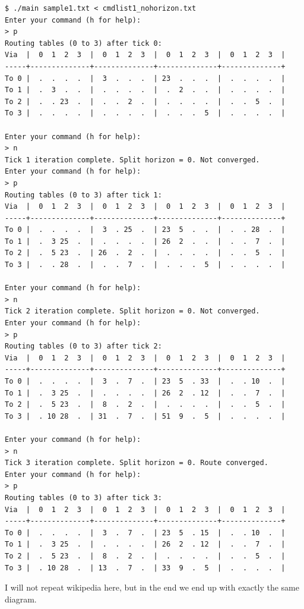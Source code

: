 \documentclass[english,11pt]{article}
\newcommand{\ok}{\fontsize{9}{11}\selectfont}
\begin{document}
\clearpage
{\ok
\begin{verbatim}
$ ./main sample1.txt < cmdlist1_nohorizon.txt
Enter your command (h for help):
> p
Routing tables (0 to 3) after tick 0:
Via  |  0  1  2  3  |  0  1  2  3  |  0  1  2  3  |  0  1  2  3  |
-----+--------------+--------------+--------------+--------------+
To 0 |  .  .  .  .  |  3  .  .  .  | 23  .  .  .  |  .  .  .  .  |
To 1 |  .  3  .  .  |  .  .  .  .  |  .  2  .  .  |  .  .  .  .  |
To 2 |  .  . 23  .  |  .  .  2  .  |  .  .  .  .  |  .  .  5  .  |
To 3 |  .  .  .  .  |  .  .  .  .  |  .  .  .  5  |  .  .  .  .  |

Enter your command (h for help):
> n
Tick 1 iteration complete. Split horizon = 0. Not converged.
Enter your command (h for help):
> p
Routing tables (0 to 3) after tick 1:
Via  |  0  1  2  3  |  0  1  2  3  |  0  1  2  3  |  0  1  2  3  |
-----+--------------+--------------+--------------+--------------+
To 0 |  .  .  .  .  |  3  . 25  .  | 23  5  .  .  |  .  . 28  .  |
To 1 |  .  3 25  .  |  .  .  .  .  | 26  2  .  .  |  .  .  7  .  |
To 2 |  .  5 23  .  | 26  .  2  .  |  .  .  .  .  |  .  .  5  .  |
To 3 |  .  . 28  .  |  .  .  7  .  |  .  .  .  5  |  .  .  .  .  |

Enter your command (h for help):
> n
Tick 2 iteration complete. Split horizon = 0. Not converged.
Enter your command (h for help):
> p
Routing tables (0 to 3) after tick 2:
Via  |  0  1  2  3  |  0  1  2  3  |  0  1  2  3  |  0  1  2  3  |
-----+--------------+--------------+--------------+--------------+
To 0 |  .  .  .  .  |  3  .  7  .  | 23  5  . 33  |  .  . 10  .  |
To 1 |  .  3 25  .  |  .  .  .  .  | 26  2  . 12  |  .  .  7  .  |
To 2 |  .  5 23  .  |  8  .  2  .  |  .  .  .  .  |  .  .  5  .  |
To 3 |  . 10 28  .  | 31  .  7  .  | 51  9  .  5  |  .  .  .  .  |

Enter your command (h for help):
> n
Tick 3 iteration complete. Split horizon = 0. Route converged.
Enter your command (h for help):
> p
Routing tables (0 to 3) after tick 3:
Via  |  0  1  2  3  |  0  1  2  3  |  0  1  2  3  |  0  1  2  3  |
-----+--------------+--------------+--------------+--------------+
To 0 |  .  .  .  .  |  3  .  7  .  | 23  5  . 15  |  .  . 10  .  |
To 1 |  .  3 25  .  |  .  .  .  .  | 26  2  . 12  |  .  .  7  .  |
To 2 |  .  5 23  .  |  8  .  2  .  |  .  .  .  .  |  .  .  5  .  |
To 3 |  . 10 28  .  | 13  .  7  .  | 33  9  .  5  |  .  .  .  .  |
\end{verbatim}
}

I will not repeat wikipedia here, but in the end we end up with exactly the same
diagram.
\end{document}
